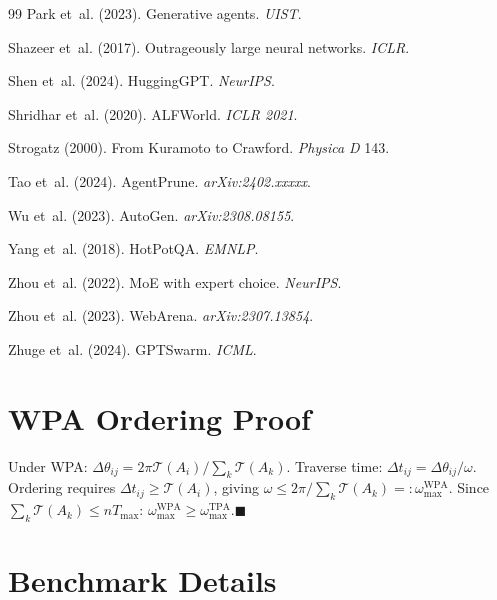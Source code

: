 \documentclass[10pt,twocolumn]{article}
\theoremstyle{plain}
\theoremstyle{definition}
\theoremstyle{remark}
\newcommand{\T}{\mathcal{T}}
\newcommand{\phase}{\theta}
\newcommand{\sweepvel}{\omega}
\begin{document}
\begin{thebibliography}{99}
Park et~al. (2023). Generative agents. \emph{UIST}.

Shazeer et~al. (2017). Outrageously large neural networks. \emph{ICLR}.

Shen et~al. (2024). HuggingGPT. \emph{NeurIPS}.

Shridhar et~al. (2020). ALFWorld. \emph{ICLR 2021}.

Strogatz (2000). From Kuramoto to Crawford. \emph{Physica D} 143.

Tao et~al. (2024). AgentPrune. \emph{arXiv:2402.xxxxx}.

Wu et~al. (2023). AutoGen. \emph{arXiv:2308.08155}.

Yang et~al. (2018). HotPotQA. \emph{EMNLP}.

Zhou et~al. (2022). MoE with expert choice. \emph{NeurIPS}.

Zhou et~al. (2023). WebArena. \emph{arXiv:2307.13854}.

Zhuge et~al. (2024). GPTSwarm. \emph{ICML}.

\end{thebibliography}

\appendix
\section{WPA Ordering Proof}
\label{app:wpa}

Under WPA: $\Delta\phase_{ij}=2\pi\T(A_i)/\sum_k\T(A_k)$.
Traverse time: $\Delta t_{ij}=\Delta\phase_{ij}/\sweepvel$.
Ordering requires $\Delta t_{ij}\geq\T(A_i)$, giving
$\sweepvel\leq 2\pi/\sum_k\T(A_k)=:\sweepvel_{\max}^{\mathrm{WPA}}$.
Since $\sum_k\T(A_k)\leq nT_{\max}$:
$\sweepvel_{\max}^{\mathrm{WPA}}\geq\sweepvel_{\max}^{\mathrm{TPA}}$.\hfill$\blacksquare$

\section{Benchmark Details}
\label{app:benchmarks}
\end{document}
